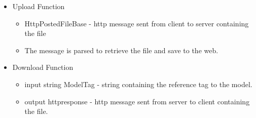     \begin{itemize}
        \item Upload Function
        \begin{itemize}
           \item HttpPostedFileBase - http message sent from client to server containing the file
           \item The message is parsed to retrieve the file and save to the web.
        \end{itemize}

        \item Download Function
        \begin{itemize}
            \item input string ModelTag - string containing the reference tag to the model.
            \item output httpresponse - http message sent from server to client containing the file. 
        \end{itemize}
    \end{itemize}